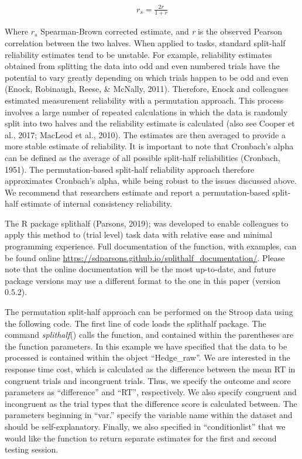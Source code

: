 \documentclass[english,,man,floatsintext]{apa6}
\begin{document}
\begin{align}
r_s=\frac{2r}{1 + r}
\end{align}

Where \(r_s\) Spearman-Brown corrected estimate, and \emph{r} is the observed Pearson correlation between the two halves. When applied to tasks, standard split-half reliability estimates tend to be unstable. For example, reliability estimates obtained from splitting the data into odd and even numbered trials have the potential to vary greatly depending on which trials happen to be odd and even (Enock, Robinaugh, Reese, \& McNally, 2011). Therefore, Enock and colleagues estimated measurement reliability with a permutation approach. This process involves a large number of repeated calculations in which the data is randomly split into two halves and the reliability estimate is calculated (also see Cooper et al., 2017; MacLeod et al., 2010). The estimates are then averaged to provide a more stable estimate of reliability. It is important to note that Cronbach's alpha can be defined as the average of all possible split-half reliabilities (Cronbach, 1951). The permutation-based split-half reliability approach therefore approximates Cronbach's alpha, while being robust to the issues discussed above. We recommend that researchers estimate and report a permutation-based split-half estimate of internal consistency reliability.

The R package splithalf (Parsons, 2019); was developed to enable colleagues to apply this method to (trial level) task data with relative ease and minimal programming experience. Full documentation of the function, with examples, can be found online \url{https://sdparsons.github.io/splithalf_documentation/}. Please note that the online documentation will be the most up-to-date, and future package versions may use a different format to the one in this paper (version 0.5.2).

The permutation split-half approach can be performed on the Stroop data using the following code. The first line of code loads the splithalf package. The command \emph{splithalf}() calls the function, and contained within the parentheses are the function parameters. In this example we have specified that the data to be processed is contained within the object \enquote{Hedge\_raw}. We are interested in the response time cost, which is calculated as the difference between the mean RT in congruent trials and incongruent trials. Thus, we specify the outcome and score parameters as \enquote{difference} and \enquote{RT}, respectively. We also specify congruent and incongruent as the trial types that the difference score is calculated between. The parameters beginning in \enquote{var.} specify the variable name within the dataset and should be self-explanatory. Finally, we also specified in \enquote{conditionlist} that we would like the function to return separate estimates for the first and second testing session.
\end{document}
